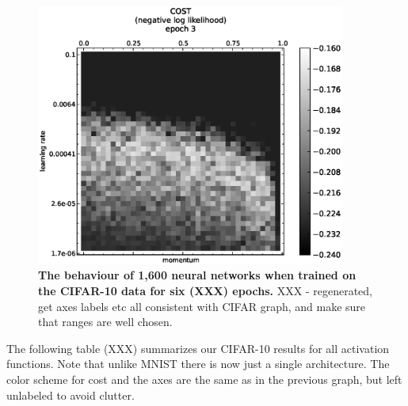 \documentclass[10pt]{article}
\begin{document}
\begin{figure}[!ht]
\begin{center}
\includegraphics[width=4in]{plots/detailed/LF-20R10R-20T10-CIFAR-3.eps}
\end{center}
\caption{ {\bf The behaviour of 1,600 neural networks when trained on
    the CIFAR-10 data for six (XXX) epochs.} XXX - regenerated, get
  axes labels etc all consistent with CIFAR graph, and make sure that
  ranges are well chosen.}
\label{fig:cifar_basic}
\end{figure}

The following table (XXX) summarizes our CIFAR-10 results for all
activation functions.  Note that unlike MNIST there is now just a
single architecture.  The color scheme for cost and the axes are the
same as in the previous graph, but left unlabeled to avoid clutter.
\end{document}
